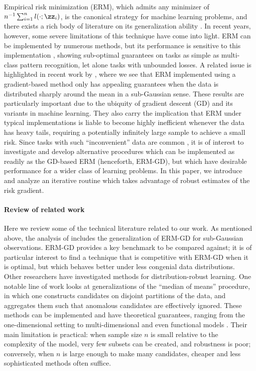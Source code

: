 \documentclass[11pt,oneside]{article}
\theoremstyle{definition} \newtheorem{defn}{Definition}       %
\theoremstyle{plain} \newtheorem{prop}[defn]{Proposition}           %
\theoremstyle{plain} \newtheorem{thm}[defn]{Theorem}                %
\theoremstyle{plain} \newtheorem{lem}[defn]{Lemma}                  %
\theoremstyle{plain} \newtheorem{cor}[defn]{Corollary}              %
\theoremstyle{remark} \newtheorem{rmk}[defn]{Remark}                %
\theoremstyle{remark} \newtheorem{ex}[defn]{Example}                %
\begin{document}
Empirical risk minimization (ERM), which admits any minimizer of $n^{-1}\sum_{i=1}^{n}l(\cdot;\zz_{i})$, is the canonical strategy for machine learning problems, and there exists a rich body of literature on its generalization ability \citep{kearns1994a,bartlett1996a,alon1997a,bartlett2003a}. In recent years, however, some severe limitations of this technique have come into light. ERM can be implemented by numerous methods, but its performance is sensitive to this implementation \citep{daniely2014a,feldman2016a}, showing sub-optimal guarantees on tasks as simple as multi-class pattern recognition, let alone tasks with unbounded losses. A related issue is highlighted in recent work by \citet{lin2016a}, where we see that ERM implemented using a gradient-based method only has appealing guarantees when the data is distributed sharply around the mean in a sub-Gaussian sense. These results are particularly important due to the ubiquity of gradient descent (GD) and its variants in machine learning. They also carry the implication that ERM under typical implementations is liable to become highly inefficient whenever the data has heavy tails, requiring a potentially infinitely large sample to achieve a small risk. Since tasks with such ``inconvenient'' data are common \citep{finkenstadt2003Extreme}, it is of interest to investigate and develop alternative procedures which can be implemented as readily as the GD-based ERM (henceforth, ERM-GD), but which have desirable performance for a wider class of learning problems. In this paper, we introduce and analyze an iterative routine which takes advantage of robust estimates of the risk gradient.


\paragraph{Review of related work}

Here we review some of the technical literature related to our work. As mentioned above, the analysis of \citet{lin2016a} includes the generalization of ERM-GD for sub-Gaussian observations. ERM-GD provides a key benchmark to be compared against; it is of particular interest to find a technique that is competitive with ERM-GD when it is optimal, but which behaves better under less congenial data distributions. Other researchers have investigated methods for distribution-robust learning. One notable line of work looks at generalizations of the ``median of means'' procedure, in which one constructs candidates on disjoint partitions of the data, and aggregates them such that anomalous candidates are effectively ignored. These methods can be implemented and have theoretical guarantees, ranging from the one-dimensional setting \citep{lerasle2011a,minsker2017a} to multi-dimensional and even functional models \citep{minsker2015a,hsu2016a,lecue2017a}. Their main limitation is practical: when sample size $n$ is small relative to the complexity of the model, very few subsets can be created, and robustness is poor; conversely, when $n$ is large enough to make many candidates, cheaper and less sophisticated methods often suffice.
\end{document}
